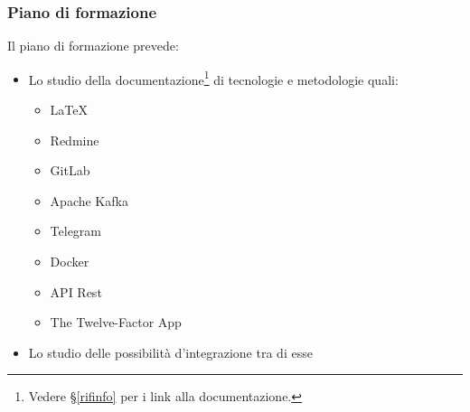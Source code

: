 		\subsubsection{Piano di formazione}
		Il piano di formazione prevede:
		\begin{itemize}
			\item Lo studio della documentazione\footnote{Vedere \S\ref{rifinfo} per i link alla documentazione.} di tecnologie e metodologie quali:
			\begin{itemize}
				\item \LaTeX
				\item Redmine
				\item GitLab
				\item Apache Kafka
				\item Telegram
				\item Docker
				\item API Rest
				\item The Twelve-Factor App
			\end{itemize}
			\item Lo studio delle possibilità d'integrazione tra di esse
		\end{itemize}
